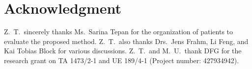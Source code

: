 \documentclass[journal,twoside,web]{ieeecolor}
\begin{document}
\begin{appendices}
%
%
%
%
%

\end{appendices}

\section*{Acknowledgment}

Z.~T.~sincerely thanks Ms.~Sarina Tepan 
for the organization of patients to evaluate the proposed method. 
Z.~T.~also thanks Drs.~Jens Frahm, Li Feng, and Kai Tobias Block 
for various discussions.
Z.~T.~and M.~U.~thank DFG for the research grant 
on TA 1473/2-1 and UE 189/4-1 (Project number: 427934942). 





\end{document}
